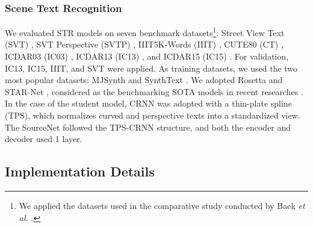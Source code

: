 \documentclass[journal]{IEEEtran}
\begin{document}
\subsubsection{Scene Text Recognition}
We evaluated STR models on seven benchmark datasets\footnote{We applied the datasets used in the comparative study conducted by Baek \textit{et al.} \cite{clova:scheme}.}: Street View Text (SVT) \cite{svt:scheme}, SVT Perspective (SVTP) \cite{svtp:scheme}, IIIT5K-Words (IIIT) \cite{iiit:scheme}, CUTE80 (CT) \cite{cute:scheme}, ICDAR03 (IC03) \cite{ic03:scheme}, ICDAR13 (IC13) \cite{ic13:scheme}, and ICDAR15 (IC15) \cite{ic15:scheme}.
For validation, IC13, IC15, IIIT, and SVT were applied. 
As training datasets, we used the two most popular datasets: MJSynth \cite{mj:scheme} and SynthText \cite{st:scheme}. 
We adopted Rosetta \cite{rosetta:scheme} and STAR-Net \cite{starnet:scheme}, considered as the benchmarking SOTA models in recent researches \cite{textocr, ocr2}.
In the case of the student model, CRNN \cite{crnn:scheme} was adopted with a thin-plate spline (TPS), which normalizes curved and perspective texts into a standardized view.
The SourceNet followed the TPS-CRNN structure, and both the encoder and decoder used 1 layer.






\subsection{Implementation Details}
\end{document}
